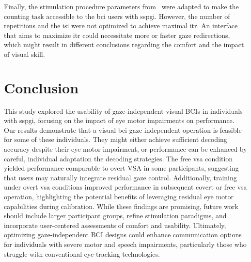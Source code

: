 \documentclass[twocolumn]{article}
\begin{document}
Finally, the stimulation procedure parameters
from~\textcite{VanDenKerchove2024} were adapted to make the counting task
accessible to the \ac{bci} users with \ac{sspgi}.
However, the number of repetitions and the \ac{isi} were not optimized to achieve
maximal \ac{itr}.
An interface that aims to maximize \ac{itr} could necessitate more or faster
gaze redirections, which might result in different conclusions regarding the
comfort and the impact of visual skill.

\acresetall
\section{Conclusion}
  This study explored the usability of gaze-independent visual BCIs in
  individuals with \ac{sspgi}, focusing on the impact of eye motor impairments
  on performance.
  Our results demonstrate that a visual \ac{bci} gaze-independent operation is feasible
  for some of these individuals.
  They might either achieve sufficient decoding accuracy despite their eye
  motor impairment, or performance can be enhanced by careful, individual
  adaptation the decoding strategies.
  The free \ac{vsa} condition yielded performance comparable to overt VSA in some participants, suggesting that users may naturally integrate residual gaze control.
  Additionally, training under overt \ac{vsa} conditions improved performance in
  subsequent covert or free \ac{vsa} operation, highlighting the potential benefits of
  leveraging residual eye motor capabilities during calibration.
  While these findings are promising, future work should include larger
  participant groups, refine stimulation paradigms, and incorporate
  user-centered assessments of comfort and usability.
  Ultimately, optimizing gaze-independent BCI designs could enhance communication
  options for individuals with severe motor and speech impairments, particularly
  those who struggle with conventional eye-tracking technologies.

\printbibliography
\end{document}
